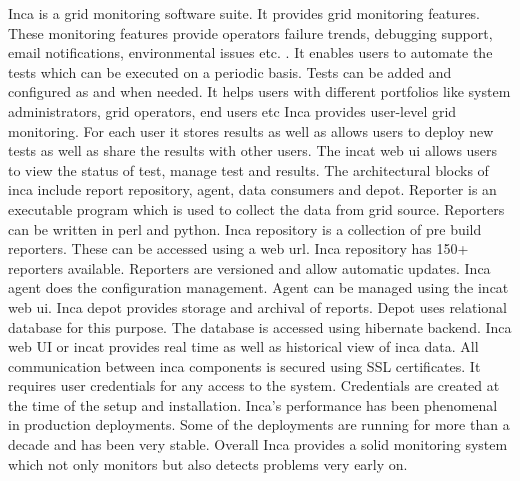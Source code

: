 \begin{enumerate}
Inca is a grid monitoring \label{\detokenize{i524/technologies:id667}}{\hyperref[\detokenize{i524/technologies:inca-book}]{\sphinxcrossref{{[}580{]}}}} software suite. It
provides grid monitoring features. These monitoring features
provide operators failure trends, debugging support, email
notifications, environmental issues etc. \label{\detokenize{i524/technologies:id668}}{\hyperref[\detokenize{i524/technologies:www-inca}]{\sphinxcrossref{{[}581{]}}}}. It
enables users to automate the tests which can be executed on a
periodic basis. Tests can be added and configured as and when
needed. It helps users with different portfolios like system
administrators, grid operators, end users etc Inca provides
user-level grid monitoring. For each user it stores results as
well as allows users to deploy new tests as well as share the
results with other users. The incat web ui allows users to view
the status of test, manage test and results. The architectural
blocks of inca include report repository, agent, data consumers
and depot. Reporter is an executable program which is used to
collect the data from grid source. Reporters can be written in
perl and python. Inca repository is a collection of pre build
reporters.  These can be accessed using a web url. Inca
repository has 150+ reporters available. Reporters are versioned
and allow automatic updates. Inca agent does the configuration
management. Agent can be managed using the incat web ui. Inca
depot provides storage and archival of reports. Depot uses
relational database for this purpose. The database is accessed
using hibernate backend.  Inca web UI or incat provides real time
as well as historical view of inca data.  All communication
between inca components is secured using SSL certificates. It
requires user credentials for any access to the
system. Credentials are created at the time of the setup and
installation. Inca's performance has been phenomenal in
production deployments. Some of the deployments are running for
more than a decade and has been very stable. Overall Inca
provides a solid monitoring system which not only monitors but
also detects problems very early on.

\end{enumerate}



